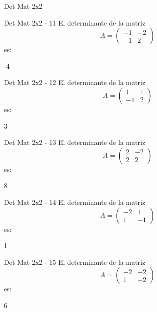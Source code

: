 \documentclass[a4,11pt]{aleph-notas}
\begin{document}
\begin{quiz}{Det Mat 2x2}
\begin{numerical}[tolerance=0]%
    {Det Mat 2x2 - 11}
    El determinante de la matriz
    \[
        A = \begin{pmatrix} -1 & -2 \\ -1 & 2 \end{pmatrix}
    \]
    es:
    \item[] -4
\end{numerical}

\begin{numerical}[tolerance=0]%
    {Det Mat 2x2 - 12}
    El determinante de la matriz
    \[
        A = \begin{pmatrix} 1 & 1 \\ -1 & 2 \end{pmatrix}
    \]
    es:
    \item[] 3
\end{numerical}

\begin{numerical}[tolerance=0]%
    {Det Mat 2x2 - 13}
    El determinante de la matriz
    \[
        A = \begin{pmatrix} 2 & -2 \\ 2 & 2 \end{pmatrix}
    \]
    es:
    \item[] 8
\end{numerical}

\begin{numerical}[tolerance=0]%
    {Det Mat 2x2 - 14}
    El determinante de la matriz
    \[
        A = \begin{pmatrix} -2 & 1 \\ 1 & -1 \end{pmatrix}
    \]
    es:
    \item[] 1
\end{numerical}

\begin{numerical}[tolerance=0]%
    {Det Mat 2x2 - 15}
    El determinante de la matriz
    \[
        A = \begin{pmatrix} -2 & -2 \\ 1 & -2 \end{pmatrix}
    \]
    es:
    \item[] 6
\end{numerical}


\end{quiz}
\end{document}
